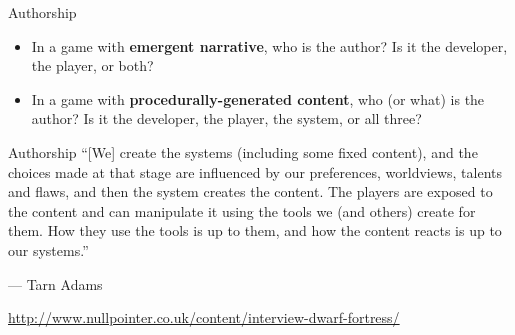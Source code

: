 \begin{frame}{Authorship}
	\begin{itemize}
		\pause\item In a game with \textbf{emergent narrative}, who is the author?
			Is it the developer, the player, or both?
		\pause\item In a game with \textbf{procedurally-generated content}, who (or what) is the author?
			Is it the developer, the player, the system, or all three?
	\end{itemize}
\end{frame}

\begin{frame}{Authorship}
	``[We] create the systems (including some fixed content), and the choices made at that stage
	are influenced by our preferences, worldviews, talents and flaws, and then the system creates the content.
	The players are exposed to the content and can manipulate it using the tools we (and others) create for them.
	How they use the tools is up to them, and how the content reacts is up to our systems.''
	
	--- Tarn Adams
	
	{\tiny\url{http://www.nullpointer.co.uk/content/interview-dwarf-fortress/}}
\end{frame}

